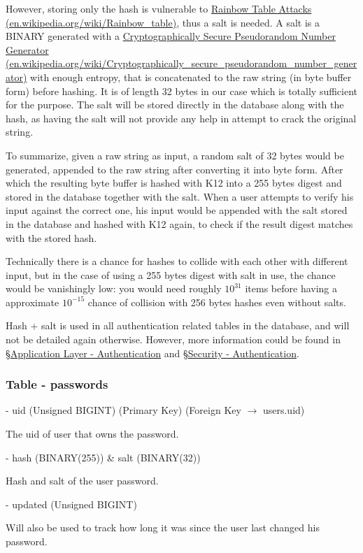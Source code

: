 \documentclass[12pt]{report}
\newcommand{\n}{\par}
\newcommand{\br}{\n\vspace{1 em}\n}
\begin{document}
However, storing only the hash is vulnerable to \href{https://en.wikipedia.org/wiki/Rainbow_table}{Rainbow Table Attacks (en.wikipedia.org\-/wiki/Rainbow\_table)},
thus a salt is needed. A salt is a BINARY generated with a
\href{https://en.wikipedia.org/wiki/Cryptographically_secure_pseudorandom_number_generator}{Cryptographically Secure Pseudorandom Number Generator (en.wikipedia.org/wiki/Cryptographically\_secure\_\-pseudorandom\_number\_generator)}
with enough entropy, that is concatenated to the raw string (in byte buffer form) before hashing.
It is of length 32 bytes in our case which is totally sufficient for the purpose.
The salt will be stored directly in the database along with the hash,
as having the salt will not provide any help in attempt to crack the original string.\n
To summarize, given a raw string as input, a random salt of 32 bytes would be generated,
appended to the raw string after converting it into byte form.
After which the resulting byte buffer is hashed with K12 into a 255 bytes digest and stored in the database together with the salt.
When a user attempts to verify his input against the correct one,
his input would be appended with the salt stored in the database and hashed with K12 again,
to check if the result digest matches with the stored hash.\n
Technically there is a chance for hashes to collide with each other with different input,
but in the case of using a 255 bytes digest with salt in use, the chance would be vanishingly low:
you would need roughly $10^{31}$ items before having a approximate $10^{-15}$ chance of collision with 256 bytes hashes even without salts.\n
Hash + salt is used in all authentication related tables in the database, and will not be detailed again otherwise.
However, more information could be found in
\S \hyperref[application-layer.implementation.authentication]{Application Layer - Authentication} and
\S \hyperref[security.authentication]{Security - Authentication}.

\subsubsection{Table - passwords} \label{data-layer.design.user-system.passwords}
\br
- uid (Unsigned BIGINT) (Primary Key) (Foreign Key $\rightarrow$ users.uid)\n
The uid of user that owns the password.
\br
- hash (BINARY(255)) \& salt (BINARY(32))\n
Hash and salt of the user password.
\br
- updated (Unsigned BIGINT)\n
Will also be used to track how long it was since the user last changed his password.
\end{document}
